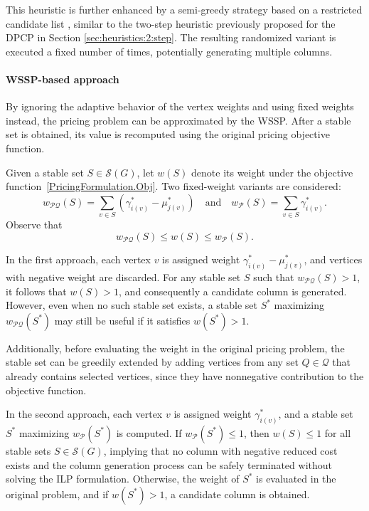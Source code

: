 \documentclass[preprint, 11pt, authoryear]{elsarticle}
\newcommand{\PP}{{\mathcal P}}
\newcommand{\QQ}{{\mathcal Q}}
\newcommand{\STAB}{{\mathscr S}}
\begin{document}
This heuristic is further enhanced by a semi-greedy strategy based on a restricted candidate list \citep{Feo1995}, similar to the two-step heuristic previously proposed for the DPCP in Section \ref{sec:heuristics:2:step}. The resulting randomized variant is executed a fixed number of times, potentially generating multiple columns.

\paragraph{WSSP-based approach}

By ignoring the adaptive behavior of the vertex weights and using fixed weights instead, the pricing problem can be approximated by the WSSP. After a stable set is obtained, its value is recomputed using the original pricing objective function.

Given a stable set $S \in \STAB(G)$, let $w(S)$ denote its weight under the objective function~\eqref{PricingFormulation.Obj}. Two fixed-weight variants are considered:
\[
w_{\PP\QQ}(S) = \sum_{v \in S} \left(\gamma^*_{i(v)} - \mu^*_{j(v)}\right)
\quad \text{and} \quad
w_{\PP}(S) = \sum_{v \in S} \gamma^*_{i(v)}.
\]
Observe that
$$w_{\PP\QQ}(S) \leq w(S) \leq w_{\PP}(S).$$

In the first approach, each vertex $v$ is assigned weight $\gamma^*_{i(v)} - \mu^*_{j(v)}$, and vertices with negative weight are discarded. For any stable set $S$ such that $w_{\PP\QQ}(S) > 1$, it follows that $w(S) > 1$, and consequently a candidate column is generated. However, even when no such stable set exists, a stable set $S^*$ maximizing $w_{\PP\QQ}(S^*)$ may still be useful if it satisfies $w(S^*) > 1$.

Additionally, before evaluating the weight in the original pricing problem, the stable set can be greedily extended by adding vertices from any set $Q \in \QQ$ that already contains selected vertices, since they have nonnegative contribution to the objective function. 

In the second approach, each vertex $v$ is assigned weight $\gamma^*_{i(v)}$, and a stable set $S^*$ maximizing $w_{\PP}(S^*)$ is computed. If $w_{\PP}(S^*) \leq 1$, then $w(S) \leq 1$ for all stable sets $S \in \STAB(G)$, implying that no column with negative reduced cost exists and the column generation process can be safely terminated without solving the ILP formulation. Otherwise, the weight of $S^*$ is evaluated in the original problem, and if $w(S^*) > 1$, a candidate column is obtained.
\end{document}
